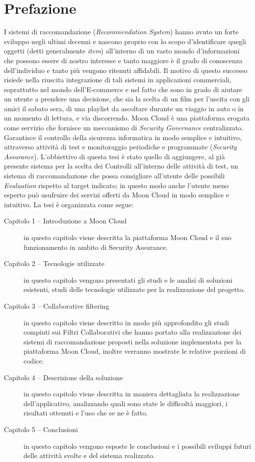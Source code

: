 \chapter{Prefazione}\label{chp:00-prefaction}
I sistemi di raccomandazione (\textit{Recommendation System}) hanno avuto un forte sviluppo negli ultimi decenni e
nascono proprio con lo scopo d'identificare quegli oggetti (detti generalmente \textit{item}) all'interno di un vasto 
mondo d'informazioni che possono essere di nostro interesse e tanto maggiore è il grado di conoscenza dell'individuo 
e tanto più vengono ritenuti affidabili.\hfill\break
Il motivo di questo successo risiede nella riuscita integrazione di tali sistemi in applicazioni commerciali, 
soprattutto nel mondo dell’E-commerce e nel fatto che sono in grado di aiutare un utente a prendere una decisione, che sia la scelta di 
un film per l'uscita con gli amici il sabato sera, di una playlist da ascoltare durante un viaggio in auto o in un momento di lettura, 
e via discorrendo.\hfill\break
Moon Cloud è una piattaforma erogata come servizio che fornisce un meccanismo di \textit{Security Governance} centralizzato. 
Garantisce il controllo della sicurezza informatica in modo semplice e intuitivo, attraverso attività di test e monitoraggio 
periodiche e programmate (\textit{Security Assurance}). L'obbiettivo di questa tesi è stato quello di aggiungere, al già 
presente sistema per la scelta dei Controlli all'interno delle attività di test, un sistema di raccomandazione che possa 
consigliare all'utente delle possibili \textit{Evaluation} rispetto al target indicato; in questo modo anche l'utente meno esperto può 
usufruire dei servizi offerti da Moon Cloud in modo semplice e intuitivo.  
\vspace{0.5 cm}
\hfill\break
La tesi è organizzata come segue:
\begin{description}
    \item[Capitolo 1 -- Introduzione a Moon Cloud] in questo capitolo viene descritta la piattaforma Moon Cloud e il suo funzionamento
    in ambito di Security Assurance. 
    \item[Capitolo 2 -- Tecnologie utilizzate] in questo capitolo vengono presentati gli studi e le analisi di soluzioni esistenti, 
    studi delle tecnologie utilizzate per la realizzazione del progetto.
    \item[Capitolo 3 -- Collaborative filtering] in questo capitolo viene descritto in modo più approfondito gli studi compiuti sui
    Filtri Collaborativi che hanno portato alla realizzazione dei sistemi di raccomandazione proposti nella soluzione implementata 
    per la piattaforma Moon Cloud, inoltre verranno mostrate le relative porzioni di codice. 
    \item[Capitolo 4 -- Descrizione della soluzione] in questo capitolo viene descritta in maniera dettagliata la realizzazione 
    dell'applicativo, analizzando quali sono state le difficoltà maggiori, i risultati ottenuti e l'uso che se ne è fatto. 
    \item[Capitolo 5 -- Conclusioni] in questo capitolo vengono esposte le conclusioni e i possibili sviluppi futuri delle attività
    svolte e del sistema realizzato.
\end{description}
